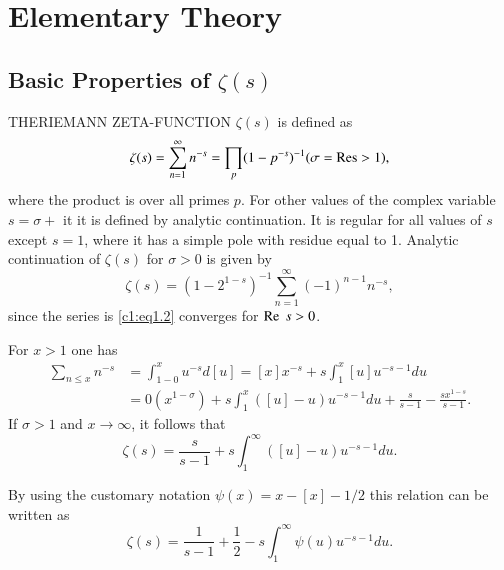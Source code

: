 \chapter{Elementary Theory}\label{c1}

\section{Basic Properties of $\zeta (s)$}\label{c1:s1}

THE\pageoriginale RIEMANN ZETA-FUNCTION $\zeta(s)$ is defined as 
\begin{equation}
\zeta(s) = \sum^\infty_{n=1} n^{-s}= \prod_p (1-p^{-s})^{-1} (\sigma =
\operatorname{Res} > 1),\label{c1:eq1.1}
\end{equation}
where the product is over all primes $p$. For other values of the
complex variable $s= \sigma +$ it it is defined by analytic
continuation. It is regular for all values of $s$ except $s=1$, where
it has a simple pole with residue equal to 1. Analytic continuation of
$\zeta(s)$ for $\sigma > 0$ is given by 
\begin{equation}
  \zeta(s) = (1- 2^{1-s})^{-1} \sum^\infty_{n=1} (-1)^{n-1}
  n^{-s},\label{c1:eq1.2} 
\end{equation}
since the series is \eqref{c1:eq1.2} converges for $\operatorname{Re} \;  s > 0$.

For $x> 1$ one has 
\begin{align*}
\sum_{n \leq x} n^{-s} & = \int^x_{1-0} u^{-s} d[u] = [x]x^{-s} + s
\int_1^x [u] u^{-s-1}du\\
& = 0 (x^{1- \sigma}) + s \int_1^x ([u] - u) u^{-s-1} du +
\frac{s}{s-1} - \frac{s x^{1-s}}{s-1}.
\end{align*}
 If $\sigma > 1$ and $x \to \infty$, it follows that
$$
\zeta (s) = \frac{s}{s-1} + s \int^\infty_1 ([u]-u) u^{-s-1} du.
$$

By using the customary notation $\psi (x) =x - [x] - 1/2$ this
relation can be written as 
\begin{equation}
  \zeta(s) = \frac{1}{s-1} + \frac{1}{2} - s \int^\infty_1 \psi (u)
  u^{-s-1}du. \label{c1:eq1.3}
\end{equation}

